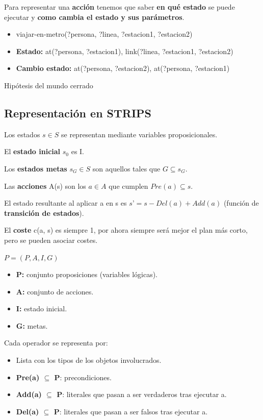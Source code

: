 \documentclass[12pt, twoside, openright]{report} %
\begin{document}
Para representar una \textbf{acción} tenemos que saber \textbf{en qué estado} se puede ejecutar y \textbf{como cambia el estado y sus parámetros}.
\begin{itemize}
	\item viajar-en-metro(?persona, ?linea, ?estacion1, ?estacion2)
	\item \textbf{Estado:} at(?persona, ?estacion1), link(?linea, ?estacion1, ?estacion2)
	\item \textbf{Cambio estado:} at(?persona, ?estacion2), at(?persona, ?estacion1)
\end{itemize}

Hipótesis del mundo cerrado

\subsection{Representación en STRIPS}
Los estados $s \in S$ se representan mediante variables proposicionales.

El \textbf{estado inicial} $s_0$ es I.

Los \textbf{estados metas} $s_G \in S$ son aquellos tales que $G \subseteq s_G$.

Las \textbf{acciones} A(s) son los $a \in A$ que cumplen $Pre(a) \subseteq s$.

El estado resultante al aplicar a en s es $s’ = s - Del(a) + Add(a)$ (función de \textbf{transición de estados}).

El \textbf{coste} c(a, s) es siempre 1, por ahora siempre será mejor el plan más corto, pero se pueden asociar costes.

$P = (P, A, I, G)$
\begin{itemize}
	\item \textbf{P:} conjunto proposiciones (variables lógicas).
	\item \textbf{A:} conjunto de acciones.
	\item \textbf{I:} estado inicial.
	\item \textbf{G:} metas.
\end{itemize}

Cada operador se representa por:
\begin{itemize}
	\item Lista con los tipos de los objetos involucrados.
	\item \textbf{Pre(a) $\subseteq$ P}: precondiciones.
	\item \textbf{Add(a) $\subseteq$ P}: literales que pasan a ser verdaderos tras ejecutar a.
	\item \textbf{Del(a) $\subseteq$ P}: literales que pasan a ser falsos tras ejecutar a.
\end{itemize}
\end{document}
